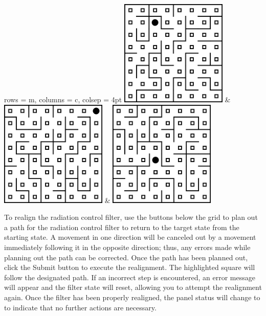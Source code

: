 \documentclass[12pt]{article}
\newcommand{\status}[1]{\fbox{\texttt{#1}}}
\begin{document}
\begin{center}
\begin{tblr}{
 rows = {m}, columns = {c},
 colsep = 4pt
}
 \includegraphics[width=2in]{4} & \includegraphics[width=2in]{5} & \includegraphics[width=2in]{6}

\end{tblr}
\end{center}

To realign the radiation control filter, use the buttons below the grid to plan out a path for the radiation control filter to return to the target state from the starting state. A movement in one direction will be canceled out by a movement immediately following it in the opposite direction; thus, any errors made while planning out the path can be corrected. Once the path has been planned out, click the Submit button to execute the realignment. The highlighted square will follow the designated path. If an incorrect step is encountered, an error message will appear and the filter state will reset, allowing you to attempt the realignment again. Once the filter has been properly realigned, the panel status will change to \status{BB} to indicate that no further actions are necessary.
\end{document}
